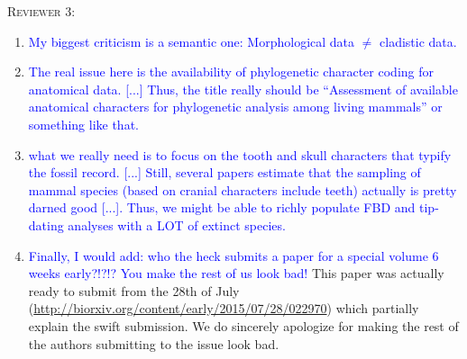 \documentclass[12pt,letterpaper]{article}
\renewcommand{\section}[1]{%
\bigskip
\begin{center}
\begin{Large}
\normalfont\scshape #1
\medskip
\end{Large}
\end{center}}
\begin{document}
\section{Reviewer 3:}
\begin{enumerate}
\item{\textcolor{blue}{My biggest criticism is a semantic one: Morphological data $\neq$ cladistic data.}}
\item{\textcolor{blue}{The real issue here is the availability of phylogenetic character coding for anatomical data.
[...] Thus, the title really should be ``Assessment of available anatomical characters for phylogenetic analysis among living mammals'' or something like that.}}
\item{\textcolor{blue}{what we really need is to focus on the tooth and skull characters that typify the fossil record.
[...] Still, several papers estimate that the sampling of mammal species (based on cranial characters include teeth) actually is pretty darned good [...].
Thus, we might be able to richly populate FBD and tip-dating analyses with a LOT of extinct species.}}
\item{\textcolor{blue}{Finally, I would add: who the heck submits a paper for a special volume 6 weeks early?!?!? You make the rest of us look bad!}}
This paper was actually ready to submit from the 28th of July (\url{http://biorxiv.org/content/early/2015/07/28/022970}) which partially explain the swift submission.
We do sincerely apologize for making the rest of the authors submitting to the issue look bad.

\end{enumerate}
\end{document}
